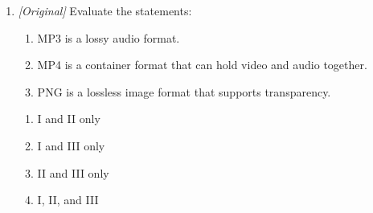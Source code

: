 \documentclass[11pt]{article}
\begin{document}
\begin{enumerate}[label=\textbf{Q\arabic*.}, leftmargin=*]
\begin{enumerate}[label=\Alph*.]
    \item JPEG
    \item ZIP
  \end{enumerate}
\item \textit{[Original]} Evaluate the statements:
  \begin{enumerate}[label=\Roman*.]
    \item MP3 is a lossy audio format.
    \item MP4 is a container format that can hold video and audio together.
    \item PNG is a lossless image format that supports transparency.
  \end{enumerate}
  \begin{enumerate}[label=\Alph*.]
    \item I and II only
    \item I and III only
    \item II and III only
    \item I, II, and III
  \end{enumerate}


\end{enumerate}
\end{document}
